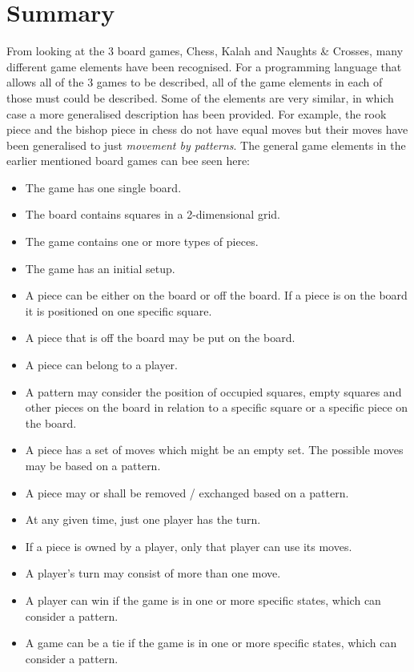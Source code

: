
\section{Summary}
From looking at the 3 board games, Chess, Kalah and Naughts \& Crosses, many different game elements have been recognised. For a programming language that allows all of the 3 games to be described, all of the game elements in each of those must could be described. Some of the elements are very similar, in which case a more generalised description has been provided. For example, the rook piece and the bishop piece in chess do not have equal moves but their moves have been generalised to just \textit{movement by patterns}. The general game elements in the earlier mentioned board games can bee seen here:
\begin{itemize}
\item The game has one single board.
\item The board contains squares in a 2-dimensional grid.
\item The game contains one or more types of pieces.
\item The game has an initial setup.
\item A piece can be either on the board or off the board. If a piece is on the board it is positioned on one specific square.
\item A piece that is off the board may be put on the board.
\item A piece can belong to a player.
\item A pattern may consider the position of occupied squares, empty squares and other pieces on the board in relation to a specific square or a specific piece on the board.
\item A piece has a set of moves which might be an empty set. The possible moves may be based on a pattern.
\item A piece may or shall be removed / exchanged based on a pattern.
\item At any given time, just one player has the turn.
\item If a piece is owned by a player, only that player can use its moves.
\item A player's turn may consist of more than one move.
\item A player can win if the game is in one or more specific states, which can consider a pattern.
\item A game can be a tie if the game is in one or more specific states, which can consider a pattern.
\end{itemize}
